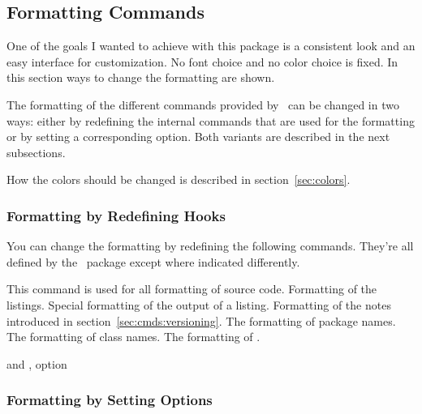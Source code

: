 \documentclass[load-preamble]{cnltx-doc}
\makeatletter
\def\cnltx{\cnltx@package@name@format{cnltx}}
\makeatother
\begin{document}
\subsection{Formatting Commands}\label{sec:cmds:formatting}

One of the goals I wanted to achieve with this package is a consistent look
and an easy interface for customization.  No font choice and no color choice
is fixed.  In this section ways to change the formatting are shown.

The formatting of the different commands provided by \cnltx\ can be
changed in two ways: either by redefining the internal commands that are used
for the formatting or by setting a corresponding option.  Both variants are
described in the next subsections.

How the colors should be changed is described in section~\ref{sec:colors}.

\subsubsection{Formatting by Redefining Hooks}

You can change the formatting by redefining the following commands.  They're
all defined by the \cnltx\ package except where indicated differently.

\begin{commands}
    This command is used for all formatting of source code.
    Formatting of the listings.
  \Default
    Special formatting of the output of a listing.
    \byclass Formatting of the notes introduced in section~\ref{sec:cmds:versioning}.
    The formatting of package names.
    The formatting of class names.
    The formatting of .
\end{commands}

\begin{example}
  \renewcommand*\codefont{\sffamily\bfseries}
   and , option 
\end{example}

\subsubsection{Formatting by Setting Options}
\end{document}
